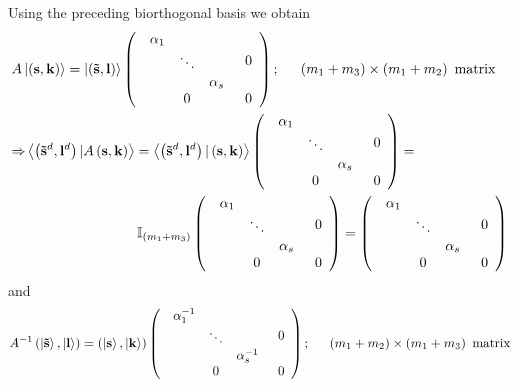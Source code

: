 \documentclass[aps,preprint]{revtex4}%
\begin{document}
Using the preceding biorthogonal basis we obtain
\begin{align}
& A\left|  \left(  \mathbf{s,k}\right)  \right\rangle =\left|  \left(
\mathbf{\tilde{s},l}\right)  \right\rangle \left(
\begin{array}
[c]{cc}%
\begin{array}
[c]{ccc}%
\alpha_{1} &  & \\
& \ddots & \\
&  & \alpha_{s}%
\end{array}
& 0\\
0 & 0
\end{array}
\right)  ;\quad\text{ }\left(  m_{1}+m_{3}\right)  \times\left(  m_{1}%
+m_{2}\right)  \text{ matrix}\nonumber\\
& \mathbb{\Rightarrow}\left\langle \left(  \mathbf{\tilde{s}}^{d}%
,\mathbf{l}^{d}\right)  |A\left(  \mathbf{s,k}\right)  \right\rangle
=\left\langle \left(  \mathbf{\tilde{s}}^{d},\mathbf{l}^{d}\right)  |\left(
\mathbf{s,k}\right)  \right\rangle \left(
\begin{array}
[c]{cc}%
\begin{array}
[c]{ccc}%
\alpha_{1} &  & \\
& \ddots & \\
&  & \alpha_{s}%
\end{array}
& 0\\
0 & 0
\end{array}
\right)  =\nonumber\\
& \qquad\qquad\qquad\qquad\quad\mathbb{I}_{\left(  m_{1}+m_{3}\right)
}\left(
\begin{array}
[c]{cc}%
\begin{array}
[c]{ccc}%
\alpha_{1} &  & \\
& \ddots & \\
&  & \alpha_{s}%
\end{array}
& 0\\
0 & 0
\end{array}
\right)  =\left(
\begin{array}
[c]{cc}%
\begin{array}
[c]{ccc}%
\alpha_{1} &  & \\
& \ddots & \\
&  & \alpha_{s}%
\end{array}
& 0\\
0 & 0
\end{array}
\right)
\end{align}
and
\begin{equation}
A^{-1}\left(  \left|  \mathbf{\tilde{s}}\right\rangle \mathbf{,}\left|
\mathbf{l}\right\rangle \right)  =\left(  \left|  \mathbf{s}\right\rangle
\mathbf{,}\left|  \mathbf{k}\right\rangle \right)  \left(
\begin{array}
[c]{cc}%
\begin{array}
[c]{ccc}%
\alpha_{1}^{-1} &  & \\
& \ddots & \\
&  & \alpha_{s}^{-1}%
\end{array}
& 0\\
0 & 0
\end{array}
\right)  ;\quad\text{ }\left(  m_{1}+m_{2}\right)  \times\left(  m_{1}%
+m_{3}\right)  \text{ matrix}%
\end{equation}
\end{document}
